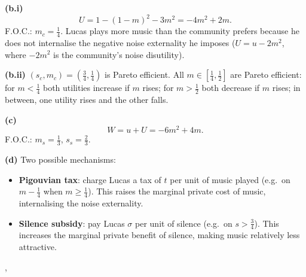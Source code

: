 {{    \textbf{(b.i)}
    \[
      U = 1 - (1-m)^2 - 3m^2 = -4m^2 + 2m.
    \]
    F.O.C.: $m_c = \tfrac{1}{4}$. Lucas plays more music than the community
    prefers because he does not internalise the negative noise externality
    he imposes ($U = u - 2m^2$, where $-2m^2$ is the community's noise
    disutility).

    \textbf{(b.ii)} $(s_c, m_c) = (\tfrac{3}{4}, \tfrac{1}{4})$ is Pareto
    efficient. All $m \in [\tfrac{1}{4}, \tfrac{1}{2}]$ are Pareto
    efficient: for $m < \tfrac{1}{4}$ both utilities increase if $m$
    rises; for $m > \tfrac{1}{2}$ both decrease if $m$ rises; in between,
    one utility rises and the other falls.

    \textbf{(c)}
    \[
      W = u + U = -6m^2 + 4m.
    \]
    F.O.C.: $m_s = \tfrac{1}{3}$, $s_s = \tfrac{2}{3}$.

    \textbf{(d)} Two possible mechanisms:
    \begin{itemize}
      \item \textbf{Pigouvian tax}: charge Lucas a tax of $t$ per unit of
            music played (e.g.\ on $m - \tfrac{1}{4}$ when $m \ge
            \tfrac{1}{4}$). This raises the marginal private cost of music,
            internalising the noise externality.
      \item \textbf{Silence subsidy}: pay Lucas $\sigma$ per unit of silence
            (e.g.\ on $s > \tfrac{3}{4}$). This increases the marginal
            private benefit of silence, making music relatively less
            attractive.
    \end{itemize}
  },
}
